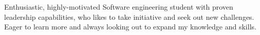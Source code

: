 

\begin{cvparagraph}

Enthusiastic, highly-motivated Software engineering student with proven leadership capabilities, who likes to take initiative and seek out new challenges. Eager to learn more and always looking out to expand my knowledge and skills.
\end{cvparagraph}
